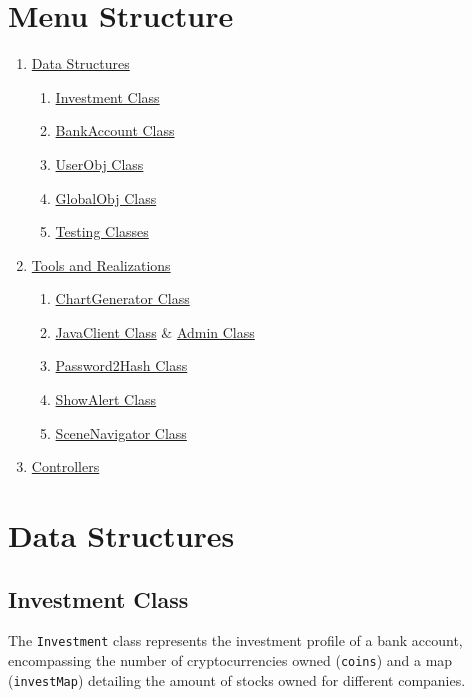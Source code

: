 \documentclass{article}
\begin{document}
\section*{Menu Structure}
\begin{enumerate}
    \item \hyperref[data-structures]{\Large{Data Structures}}
    \begin{enumerate}
        \item \hyperref[investment]{\large{Investment Class}}
        \item \hyperref[bank-account]{\large{BankAccount Class}}
        \item \hyperref[user-obj]{\large{UserObj Class}}
        \item \hyperref[global-obj]{\large{GlobalObj Class}}
        \item \hyperref[testing]{\large{Testing Classes}}
    \end{enumerate}
    \item \hyperref[tools]{\Large{Tools and Realizations}}
    \begin{enumerate}
        \item \hyperref[chart-generator]{\large{ChartGenerator Class}}
        \item \hyperref[java-client]{\large{JavaClient Class}} \& \hyperref[admin]{\large{Admin Class}}
        \item \hyperref[pw2hash]{\large{Password2Hash Class}}
        \item \hyperref[show-alert]{\large{ShowAlert Class}}
        \item \hyperref[scene-navigator]{\large{SceneNavigator Class}}
    \end{enumerate}
    \item \hyperref[controllers]{\Large{Controllers}}
\end{enumerate}
    
\newpage
\section{Data Structures}\label{data-structures}

\subsection{Investment Class}\label{investment}

The \texttt{Investment} class represents the investment profile of a bank account, encompassing the number of cryptocurrencies owned (\texttt{coins}) and a map (\texttt{investMap}) detailing the amount of stocks owned for different companies.
\end{document}
